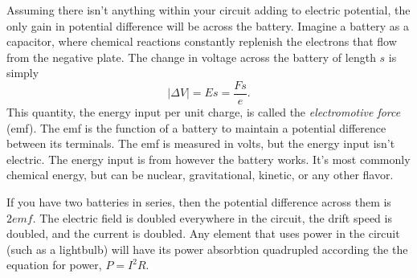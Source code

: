 \documentclass[nobib]{tufte-handout}
\begin{document}
Assuming there isn't anything within 
your circuit adding to electric potential, 
the only gain in potential difference will 
be across the battery. Imagine a battery 
as a capacitor, where chemical reactions 
constantly replenish the electrons that flow 
from the negative plate. The change in 
voltage across the battery of length $s$ is simply 
\[|\Delta V| = Es = \frac{Fs}{e}.\]
This quantity, the energy input per unit charge, is called 
the \emph{electromotive force} (emf). 
The emf is the function of a battery to 
maintain a potential difference between its
terminals. The emf is measured in volts, but 
the energy input isn't electric. The energy input 
is from however the battery works. It's most commonly 
chemical energy, but can be nuclear, gravitational, 
kinetic, or any other flavor. 

If you have two batteries in series, 
then the potential difference across them 
is $2emf$. The electric field is doubled everywhere 
in the circuit, the drift speed is doubled, 
and the current is doubled. Any element 
that uses power in the circuit (such as 
a lightbulb) will have its power absorbtion quadrupled 
according the the equation for power, 
$P = I^2 R$. 
\end{document}
